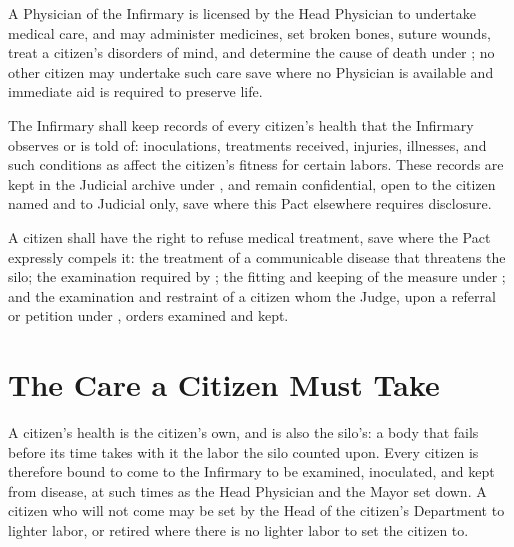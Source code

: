 \begin{clauses}
\item A Physician of the Infirmary is licensed by the Head Physician to undertake medical care, and may administer medicines, set broken bones, suture wounds, treat a citizen's disorders of mind, and determine the cause of death under ; no other citizen may undertake such care save where no Physician is available and immediate aid is required to preserve life.
\item The Infirmary shall keep records of every citizen's health that the Infirmary observes or is told of: inoculations, treatments received, injuries, illnesses, and such conditions as affect the citizen's fitness for certain labors. These records are kept in the Judicial archive under , and remain confidential, open to the citizen named and to Judicial only, save where this Pact elsewhere requires disclosure.
\item A citizen shall have the right to refuse medical treatment, save where the Pact expressly compels it: the treatment of a communicable disease that threatens the silo; the examination required by ; the fitting and keeping of the measure under ; and the examination and restraint of a citizen whom the Judge, upon a referral or petition under , orders examined and kept.
\end{clauses}

\section{The Care a Citizen Must Take}
\label{sec:health:care-a-citizen-must-take}

A citizen's health is the citizen's own, and is also the silo's: a body that fails before its time takes with it the labor the silo counted upon. Every citizen is therefore bound to come to the Infirmary to be examined, inoculated, and kept from disease, at such times as the Head Physician and the Mayor set down. A citizen who will not come may be set by the Head of the citizen's Department to lighter labor, or retired where there is no lighter labor to set the citizen to.

